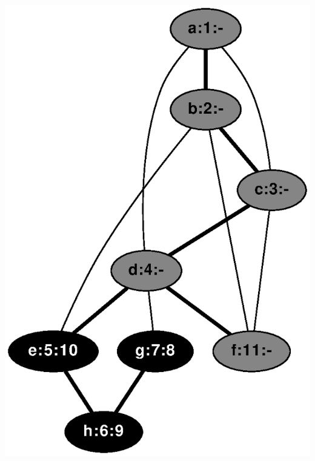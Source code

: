 \documentclass{article}
\begin{document}
\includegraphics[height=.3\textheight]{dfs_undirected_classroom_11.eps}
\vspace{1em}
\end{document}
